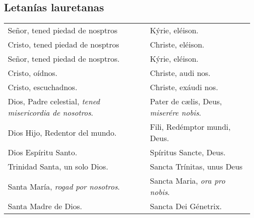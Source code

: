 \documentclass[./rosary.tex]{subfiles}
\begin{document}
\subsection*{Letanías lauretanas}
\begin{longtable} { p{} p{} }
    Señor, tened piedad de nosptros                                                                                          & Kýrie, eléison.                              \\
    Cristo, tened piedad de nosptros                                                                                         & Christe, eléison.                            \\
    Señor, tened piedad de nosptros.                                                                                         & Kýrie, eléison.                              \\
    Cristo, oídnos.                                                                                                          & Christe, audi nos.                           \\
    Cristo, escuchadnos.                                                                                                     & Christe, exáudi nos.                         \\
    Dios, Padre celestial, \emph{tened misericordia de nosotros}.                                                            & Pater de cælis, Deus, \emph{miserére nobis}. \\
    Dios Hijo, Redentor del mundo.                                                                                           & Fili, Redémptor mundi, Deus.                 \\
    Dios Espíritu Santo.                                                                                                     & Spíritus Sancte, Deus.                       \\
    Trinidad Santa, un solo Dios.                                                                                            & Sancta Trínitas, unus Deus                   \\
    Santa María, \emph{rogad por nosotros}.                                                                                  & Sancta Maria, \emph{ora pro nobis}.          \\
    Santa Madre de Dios.                                                                                                     & Sancta Dei Génetrix.                         \\

\end{longtable}
\end{document}

